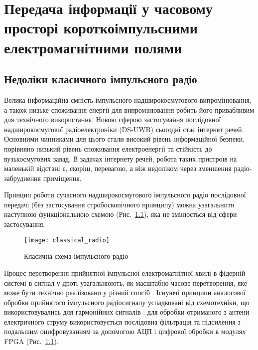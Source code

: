 \chapter{Передача інформації у часовому просторі короткоімпульсними 
електромагнітними полями}
\label{ch:neuron}

\section{Недоліки класичного імпульсного радіо}

Велика інформаційна ємність імпульсного надширокосмугового випромінювання, 
а також низьке споживання енергії для випромінювання робить його привабливим 
для технічного використання. Новою сферою застосування послідовної 
надширокосмугової радіоелектроніки (DS-UWB) сьогодні стає інтернет речей. 
Основними чинниками для цього стали високий рівень інформаційної безпеки, 
порівняно низький рівень споживання електроенергії та стійкість до 
вузькосмугових завад. В задачах інтернету речей, робота таких пристроїв на 
маленькій відстані є, скоріш, перевагою, а ніж недоліком через
зменшення радіо-забруднення приміщення.

Принцип роботи сучасного надширокосмугового імпульсного радіо 
послідовної передачі (без застосування стробоскопічного принципу) 
\cite{imp:ChannelImplementation} можна узагальнити наступною 
функціональною схемою (Рис.~\ref{fig:emp_radio}), яка не змінюється
від сфери застосування.

\begin{figure}[htbp] \begin{center}
\texttt{[image: classical\_radio]}
\caption{Класична схема імпульсного радіо} \label{fig:emp_radio}
\end{center} \end{figure}

Процес перетворення прийнятної імпульсної електромагнітної хвилі в фідерній 
системі в сигнал у дроті узагальнюють, як масштабно-часове перетворення, яке 
може бути технічно реалізовано у різний спосіб \cite{imp:Astanin1989}. 
Існуючі принципи аналогової обробки прийнятого імпульсного радіосигналу 
успадковані від схемотехніки, що використовувались для гармонійних сигналів 
\cite{imp:ComunicationsOverview}: для обробки отриманого з антени 
електричного струму використовується послідовна фільтрація та підсилення з 
подальшим оцифровуванням за допомогою АЦП і цифрової обробки в модулях 
FPGA (Рис.~\ref{fig:emp_radio}).

